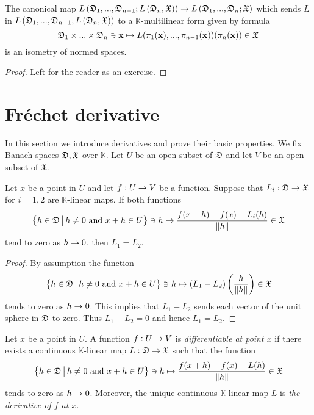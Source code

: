 \begin{proposition}\label{proposition:multilinear_maps_canonical_isometry}
The canonical map $L\left({\mathfrak D}_1,...,{\mathfrak D}_{n-1};L\left({\mathfrak D}_n,{\mathfrak X}\right)\right) \rightarrow L\left({\mathfrak D}_1,...,{\mathfrak D}_n;{\mathfrak X}\right)$
which sends $L$ in $L\left({\mathfrak D}_1,...,{\mathfrak D}_{n-1};L\left({\mathfrak D}_n,{\mathfrak X}\right)\right)$ to a $\mathbb{K}$-multilinear form given by formula 
$${\mathfrak D}_1\times ...\times {\mathfrak D}_n \ni \mathbf{x} \mapsto L(\pi_{1}(\mathbf{x}),...,\pi_{n-1}(\mathbf{x}))(\pi_n(\mathbf{x})) \in {\mathfrak X}$$
is an isometry of normed spaces.
\end{proposition}
\begin{proof}
Left for the reader as an exercise.
\end{proof}

\section{Fr{\'e}chet derivative}
\noindent
In this section we introduce derivatives and prove their basic properties. We fix Banach spaces ${\mathfrak D},{\mathfrak X}$ over $\mathbb{K}$. Let $U$ be an open subset of ${\mathfrak D}$ and let $V$ be an open subset of ${\mathfrak X}$.

\begin{fact}\label{fact:uniqueness_of_derivative}
Let $x$ be a point in $U$ and let $f:U\rightarrow V$ be a function. Suppose that $L_i:{\mathfrak D}\rightarrow {\mathfrak X}$ for $i=1,2$ are $\mathbb{K}$-linear maps. If both functions
$$\big\{h\in {\mathfrak D}\,\big|\,h\neq 0\mbox{ and }x+h\in U\big\} \ni h\mapsto \frac{f(x+h) - f(x) - L_i(h)}{\lVert h \rVert} \in {\mathfrak X}$$
tend to zero as $h\rightarrow 0$, then $L_1 = L_2$.
\end{fact}
\begin{proof}
By assumption the function
$$\big\{h\in {\mathfrak D}\,\big|\,h\neq 0\mbox{ and }x+h\in U\big\} \ni h\mapsto \left(L_1 - L_2\right)\left(\frac{h}{\lVert h \rVert}\right) \in {\mathfrak X}$$
tends to zero as $h\rightarrow 0$. This implies that $L_1 - L_2$ sends each vector of the unit sphere in ${\mathfrak D}$ to zero. Thus $L_1 - L_2 = 0$ and hence $L_1 = L_2$. 
\end{proof}

\begin{definition}
Let $x$ be a point in $U$. A function $f:U\rightarrow V$ is \textit{differentiable at point $x$} if there exists a continuous $\mathbb{K}$-linear map $L:{\mathfrak D}\rightarrow {\mathfrak X}$ such that the function 
$$\big\{h\in {\mathfrak D}\,\big|\,h\neq 0\mbox{ and }x+h\in U\big\} \ni h\mapsto \frac{f(x+h) - f(x) - L(h)}{\lVert h \rVert} \in {\mathfrak X}$$
tends to zero as $h\rightarrow 0$. Moreover, the unique continuous $\mathbb{K}$-linear map $L$ is \textit{the derivative of $f$ at $x$}.
\end{definition}

